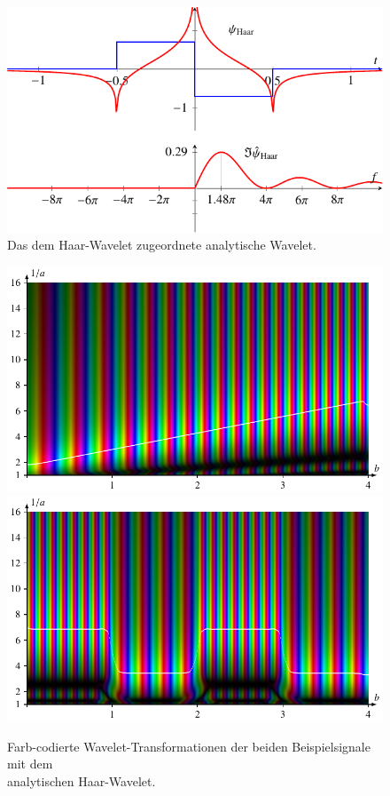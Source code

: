 \begin{figure}
	\centering
	\includegraphics{papers/complex/images/ahaar.pdf}
	\caption{Das dem Haar-Wavelet zugeordnete analytische Wavelet.}
	\label{complex:ahaar}
\end{figure}

\begin{figure}
	\centering
	\includegraphics{papers/complex/images/chirp_ahaar.pdf}
	\includegraphics{papers/complex/images/square_ahaar.pdf}
	\caption{Farb-codierte Wavelet-Transformationen der beiden Beispielsignale mit dem \\ analytischen Haar-Wavelet.}
	\label{complex:ahaar-ex}
\end{figure}

